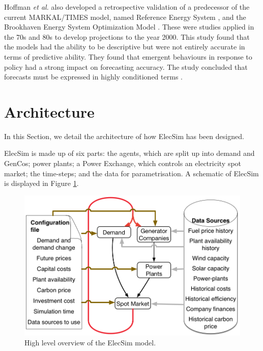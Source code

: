 Hoffman \textit{et al.} also developed a retrospective validation of a predecessor of the current MARKAL\slash TIMES model, named Reference Energy System \cite{Hoffman_1973}, and the Brookhaven Energy System Optimization Model \cite{ERDA_48}. These were studies applied in the 70s and 80s to develop projections to the year 2000. This study found that the models had the ability to be descriptive but were not entirely accurate in terms of predictive ability. They found that emergent behaviours in response to policy had a strong impact on forecasting accuracy. The study concluded that forecasts must be expressed in highly conditioned terms \cite{Hoffman2011}. 




















\clearpage
\section{Architecture}
\label{elecsim:sec:architecture}

In this Section, we detail the architecture of how ElecSim has been designed.

ElecSim is made up of six parts: the agents, which are split up into demand and GenCos; power plants; a Power Exchange, which controls an electricity spot market; the time-steps; and the data for parametrisation. A schematic of ElecSim is displayed in Figure \ref{fig:systemoverview}.

\begin{figure}
	\centering
	\includegraphics[width=0.85\linewidth]{Chapter4/figures/System_overview_large.png}
	\caption{High level overview of the ElecSim model.}
	\label{fig:systemoverview}
\end{figure}

